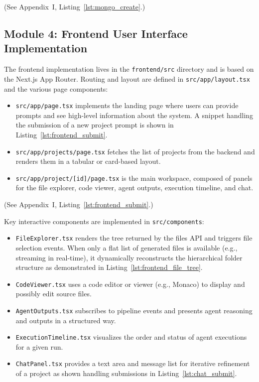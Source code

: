 (See Appendix~I, Listing~\ref{lst:mongo_create}.)

\subsection*{Module 4: Frontend User Interface Implementation}

The frontend implementation lives in the \texttt{frontend/\allowbreak{}src} directory and is based on the Next.js App Router. Routing and layout are defined in \texttt{src/\allowbreak{}app/\allowbreak{}layout.tsx} and the various page components:
\begin{itemize}
    \item \texttt{src/\allowbreak{}app/\allowbreak{}page.tsx} implements the landing page where users can provide prompts and see high-level information about the system. A snippet handling the submission of a new project prompt is shown in Listing~\ref{lst:frontend_submit}.
    \item \texttt{src/\allowbreak{}app/\allowbreak{}projects/\allowbreak{}page.tsx} fetches the list of projects from the backend and renders them in a tabular or card-based layout.
    \item \texttt{src/\allowbreak{}app/\allowbreak{}project/\allowbreak{}[id]/\allowbreak{}page.tsx} is the main workspace, composed of panels for the file explorer, code viewer, agent outputs, execution timeline, and chat.
\end{itemize}

(See Appendix~I, Listing~\ref{lst:frontend_submit}.)

Key interactive components are implemented in \texttt{src/\allowbreak{}components}:
\begin{itemize}
    \item \texttt{FileExplorer.tsx} renders the tree returned by the files API and triggers file selection events. When only a flat list of generated files is available (e.g., streaming in real-time), it dynamically reconstructs the hierarchical folder structure as demonstrated in Listing~\ref{lst:frontend_file_tree}.
    \item \texttt{CodeViewer.tsx} uses a code editor or viewer (e.g., Monaco) to display and possibly edit source files.
    \item \texttt{AgentOutputs.tsx} subscribes to pipeline events and presents agent reasoning and outputs in a structured way.
    \item \texttt{ExecutionTimeline.tsx} visualizes the order and status of agent executions for a given run.
    \item \texttt{ChatPanel.tsx} provides a text area and message list for iterative refinement of a project as shown handling submissions in Listing~\ref{lst:chat_submit}.
\end{itemize}


